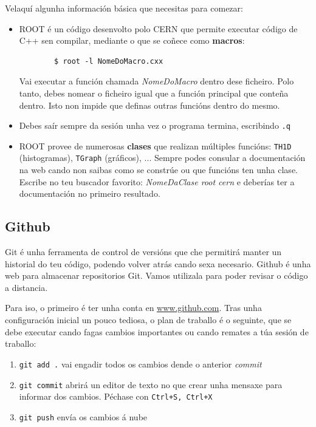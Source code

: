 \documentclass[11pt, a4paper]{article}
\begin{document}
Velaquí algunha información básica que necesitas para comezar:
\begin{itemize}
    \item ROOT é un código desenvolto polo CERN que permite executar código de C++ sen compilar, mediante o que se coñece como \textbf{macros}:
          \begin{lstlisting}
        $ root -l NomeDoMacro.cxx
    \end{lstlisting}

          Vai executar a función chamada \textit{NomeDoMacro} dentro dese ficheiro. Polo tanto, debes nomear o ficheiro igual que a función principal que conteña dentro. Isto non impide que definas outras funcións dentro do mesmo.
    \item Debes saír sempre da sesión unha vez o programa termina, escribindo
          \lstinline|.q|
    \item ROOT provee de numerosas \textbf{clases} que realizan múltiples funcións: \lstinline|TH1D| (histogramas), \lstinline|TGraph| (gráficos), ... Sempre podes consular a documentación na web cando non saibas como se constrúe ou que funcións ten unha clase. Escribe no teu buscador favorito: \textit{NomeDaClase root cern} e deberías ter a documentación no primeiro resultado.
\end{itemize}

\subsection{Github}
Git é unha ferramenta de control de versións que che permitirá manter un historial do teu código, podendo volver atrás cando sexa necesario. Github é unha web para almacenar repositorios Git. Vamos utilizala para poder revisar o código a distancia.

Para iso, o primeiro é ter unha conta en \url{www.github.com}. Tras unha configuración inicial un pouco tediosa, o plan de traballo é o seguinte, que se debe executar cando fagas cambios importantes ou cando remates a túa sesión de traballo:
\begin{enumerate}
    \item \lstinline|git add .| vai engadir todos os cambios dende o anterior \textit{commit}
    \item \lstinline|git commit| abrirá un editor de texto no que crear unha mensaxe para informar dos cambios. Péchase con \lstinline|Ctrl+S, Ctrl+X|
    \item \lstinline|git push| envía os cambios á nube
\end{enumerate}
\end{document}
